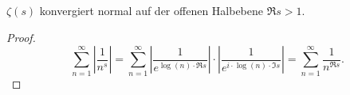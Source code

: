 \begin{frame}
    \begin{lemma}[Konvergenzgebiet]
        $\zeta(s)$ konvergiert normal auf der offenen Halbebene $\Re s > 1$.
    \end{lemma}
    \begin{proof}
    \[\sum_{n=1}^\infty \left|\frac{1}{n^s}\right| =  \sum_{n=1}^\infty \left|\frac{1}{e^{\log(n)\cdot \Re s}}\right| \cdot \left|\frac{1}{e^{i \cdot \log(n) \cdot \Im s}}\right| = \sum_{n=1}^\infty \frac{1}{n^{\Re s}}.\] 
    \end{proof}

\end{frame}